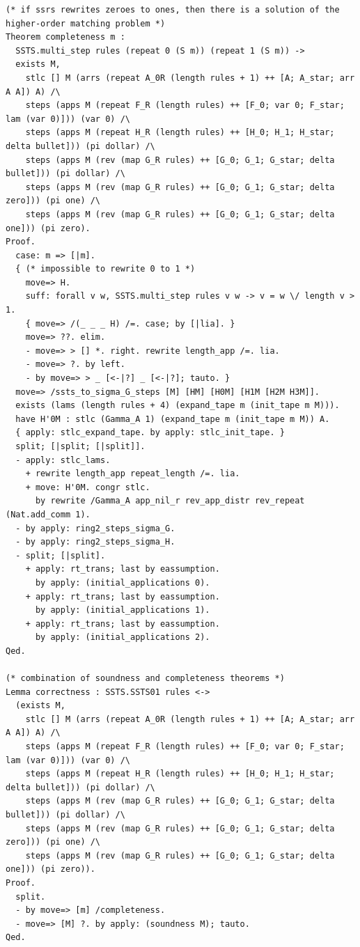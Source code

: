 \documentclass[10pt,a4paper]{amsart}
\begin{document}
\begin{lstlisting}
(* if ssrs rewrites zeroes to ones, then there is a solution of the higher-order matching problem *)
Theorem completeness m :
  SSTS.multi_step rules (repeat 0 (S m)) (repeat 1 (S m)) ->
  exists M,
    stlc [] M (arrs (repeat A_0R (length rules + 1) ++ [A; A_star; arr A A]) A) /\
    steps (apps M (repeat F_R (length rules) ++ [F_0; var 0; F_star; lam (var 0)])) (var 0) /\
    steps (apps M (repeat H_R (length rules) ++ [H_0; H_1; H_star; delta bullet])) (pi dollar) /\
    steps (apps M (rev (map G_R rules) ++ [G_0; G_1; G_star; delta bullet])) (pi dollar) /\
    steps (apps M (rev (map G_R rules) ++ [G_0; G_1; G_star; delta zero])) (pi one) /\
    steps (apps M (rev (map G_R rules) ++ [G_0; G_1; G_star; delta one])) (pi zero).
Proof.
  case: m => [|m].
  { (* impossible to rewrite 0 to 1 *)
    move=> H.
    suff: forall v w, SSTS.multi_step rules v w -> v = w \/ length v > 1.
    { move=> /(_ _ _ H) /=. case; by [|lia]. }
    move=> ??. elim.
    - move=> > [] *. right. rewrite length_app /=. lia.
    - move=> ?. by left.
    - by move=> > _ [<-|?] _ [<-|?]; tauto. }
  move=> /ssts_to_sigma_G_steps [M] [HM] [H0M] [H1M [H2M H3M]].
  exists (lams (length rules + 4) (expand_tape m (init_tape m M))).
  have H'0M : stlc (Gamma_A 1) (expand_tape m (init_tape m M)) A.
  { apply: stlc_expand_tape. by apply: stlc_init_tape. }
  split; [|split; [|split]].
  - apply: stlc_lams.
    + rewrite length_app repeat_length /=. lia.
    + move: H'0M. congr stlc.
      by rewrite /Gamma_A app_nil_r rev_app_distr rev_repeat (Nat.add_comm 1).
  - by apply: ring2_steps_sigma_G.
  - by apply: ring2_steps_sigma_H.
  - split; [|split].
    + apply: rt_trans; last by eassumption.
      by apply: (initial_applications 0).
    + apply: rt_trans; last by eassumption.
      by apply: (initial_applications 1).
    + apply: rt_trans; last by eassumption.
      by apply: (initial_applications 2).
Qed.

(* combination of soundness and completeness theorems *)
Lemma correctness : SSTS.SSTS01 rules <-> 
  (exists M,
    stlc [] M (arrs (repeat A_0R (length rules + 1) ++ [A; A_star; arr A A]) A) /\
    steps (apps M (repeat F_R (length rules) ++ [F_0; var 0; F_star; lam (var 0)])) (var 0) /\
    steps (apps M (repeat H_R (length rules) ++ [H_0; H_1; H_star; delta bullet])) (pi dollar) /\
    steps (apps M (rev (map G_R rules) ++ [G_0; G_1; G_star; delta bullet])) (pi dollar) /\
    steps (apps M (rev (map G_R rules) ++ [G_0; G_1; G_star; delta zero])) (pi one) /\
    steps (apps M (rev (map G_R rules) ++ [G_0; G_1; G_star; delta one])) (pi zero)).
Proof.
  split.
  - by move=> [m] /completeness.
  - move=> [M] ?. by apply: (soundness M); tauto.
Qed.


\end{lstlisting}
\end{document}

